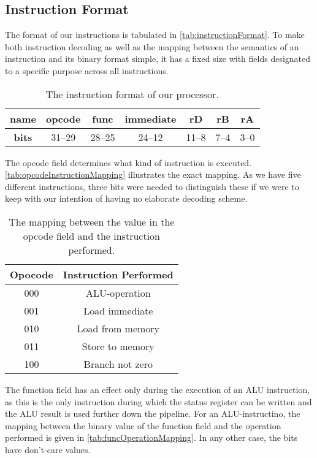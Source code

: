 \documentclass[11pt]{article}
\begin{document}
\subsection{Instruction Format}
\label{subsec:instructionformat} 
The format of our instructions is tabulated in
\autoref{tab:instructionFormat}. To make both instruction decoding as
well as the mapping between the semantics of an instruction and its
binary format simple, it has a fixed size with fields designated to a
specific purpose across all instructions. 
\begin{table}[htbp]
  \centering
  \begin{tabular}{|c|c|c|c|c|c|c|}
    \hline
    {\bf name} & opcode & func & immediate & rD & rB & rA \\ \hline
    {\bf bits} & 31--29 & 28--25 & 24--12 & 11--8 & 7--4 & 3--0 \\ \hline
  \end{tabular}
  \caption{The instruction format of our processor.}
  \label{tab:instructionFormat}
\end{table}

The opcode field determines what kind of instruction is
executed. \autoref{tab:opcodeInstructionMapping} illustrates the exact
mapping. As we have five different instructions, three bits were
needed to distinguish these if we were to keep with our intention of
having no elaborate decoding scheme.

\begin{table}[htbp]
  \centering
  \begin{tabular}{|c|c|}
    \hline
    {\bf Opocode} & {\bf Instruction Performed} \\ \hline
    000 & ALU-operation \\ \hline
    001 & Load immediate \\ \hline
    010 & Load from memory \\ \hline
    011 & Store to memory \\ \hline
    100 & Branch not zero \\ \hline
  \end{tabular}
  \caption{The mapping between the value in the opcode field and the instruction performed.}
  \label{tab:opcodeInstructionMapping}
\end{table}

The function field has an effect only during the execution of an ALU
instruction, as this is the only instruction during which the status
register can be written and the ALU result is used further down the
pipeline. For an ALU-instructino, the mapping between the binary value
of the function field and the operation performed is given in
\autoref{tab:funcOperationMapping}. In any other case, the bits have
don't-care values.
\end{document}
